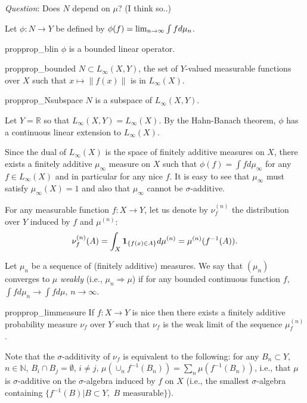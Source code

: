 \documentclass[12pt]{article}
\newcommand{\todoc}[2][]{\todo[color=Apricot,#1]{#2}}
\newcommand{\ra}{\rightarrow}
\newcommand{\real}{\mathbb{R}}
\newcommand{\one}[1]{\mathbf{1}_{\{#1\}}}
\renewcommand{\natural}{\mathbb{N}}
\begin{document}
\noindent \emph{Question}: Does $N$ depend on $\mu$? (I think so..)

Let $\phi:N \ra Y$ be defined by $\phi(f) = \lim_{n\ra\infty} \int f \dmu_n$. 
\begin{restatable}{prop}{prop_blin}
$\phi$ is a bounded linear operator.
\end{restatable}

\begin{restatable}{prop}{prop_bounded}
$N \subset L_{\infty}(X,Y)$, the set of $Y$-valued  measurable functions over $X$ such that $x\mapsto \| f(x)\|$ is in $L_{\infty}(X)$.
\end{restatable}

\begin{restatable}{prop}{prop_Nsubspace}
$N$ is a subspace of $L_{\infty}(X,Y)$.
\end{restatable}

Let $Y = \real$ so that $L_\infty(X,Y) = L_\infty(X)$. 
By the Hahn-Banach theorem, $\phi$ has a continuous linear extension to $L_{\infty}(X)$. \todoc{Generalization for  $L_{\infty}(X,Y)$}

Since the dual of $L_{\infty}(X)$ is the space of finitely additive measures on $X$, there exists a finitely additive $\mu_\infty$ measure on $X$ such that $\phi(f) = \int f d\mu_{\infty}$ for any $f\in L_{\infty}(X)$ and in particular for any nice $f$.
It is easy to see that $\mu_\infty$ must satisfy $\mu_{\infty}(X) = 1$ and also that $\mu_\infty$ cannot be $\sigma$-additive.

For any measurable function $f:X \ra Y$, let us denote  
by $\nu^{(n)}_f$ the distribution over $Y$ induced by $f$ and $\mu^{(n)}$:
\[
\nu^{(n)}_f(A) = \int_X \one{f(x)\in A} \dmu^{(n)} = \mu^{(n)}( f^{-1}(A) ).
\]

Let $\mu_n$ be a sequence of (finitely additive) measures.
We say that $(\mu_n)$ converges to $\mu$ \emph{weakly} (i.e., $\mu_n \Rightarrow \mu$) if for any bounded continuous function $f$, $\int f d\mu_n \ra \int f d\mu$, $n\ra\infty$.

\begin{restatable}{prop}{prop_limmeasure}
If $f:X\ra Y$ is nice then there exists a finitely additive probability measure $\nu_f$ over $Y$ such that $\nu_f$ is the weak limit of the sequence $\mu^{(n)}_f$.
\end{restatable}

Note that the $\sigma$-additivity of $\nu_f$ is equivalent to the following: for any $B_n\subset Y$, $n\in \natural$, $B_i \cap B_j = \emptyset$, $i\ne j$, $\mu(\cup_n f^{-1}(B_n) ) = \sum_n \mu(f^{-1}(B_n))$, i.e., that $\mu$ is $\sigma$-additive on the $\sigma$-algebra induced by $f$ on $X$ (i.e., the smallest $\sigma$-algebra containing $\{f^{-1}(B)| B \subset Y, \,\, B \text{ measurable}\}$).
\end{document}
